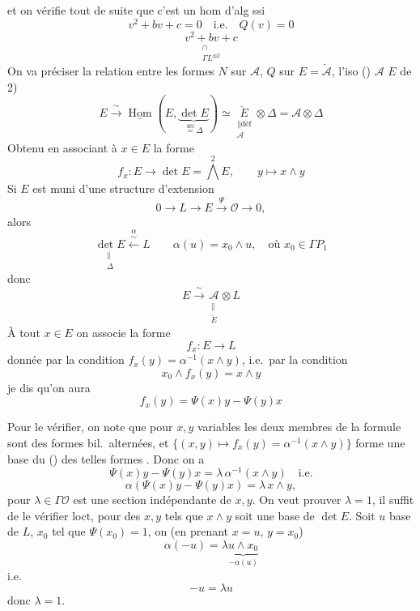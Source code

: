 \documentclass[11pt,a4paper]{article}
\begin{document}
et on vérifie tout de suite que c'est un hom d'alg ssi
\[
  v^2 + b v + c = 0 \quad \text{i.e.} \quad Q(v) = 0
\]
\[
  \underset{\substack{\cap \\ \Gamma L^{\otimes 2}}}{v^2 + b v + c}
\]
On va préciser la relation entre les formes $N$ sur $\mathcal{A}$, $Q$ sur $E = \check{\mathcal{A}}$,   l'iso () \ill{} $\mathcal{A}$ $E$    de 2)
\[
  E \xrightarrow{\ \sim\ } \underline{\operatorname{Hom}}(E, \underbrace{\det E}_{\overset{\text{déf}}{=} \Delta}) \simeq \underset{\substack{\| \text{déf} \\ \mathcal{A}}}{\check{E}} \otimes \Delta = \mathcal{A} \otimes \Delta
\]
Obtenu en associant à $x \in E$ la forme
\[
  f_x : E \to \det E = \textstyle\bigwedge^2 E , \qquad y \mapsto x \wedge y
\]
Si $E$ est muni d'une structure d'extension
\[
  0 \to L \to E \xrightarrow{\ \Psi\ } \mathcal{O} \to 0 ,
\]
alors
\[
  \underset{\substack{\| \\ \Delta}}{\det E} \overset{\alpha}{\xleftarrow{\ \sim\ }} L
  \qquad \alpha(u) = x_0 \wedge u , \quad \text{où } x_0 \in \Gamma P_1
\]
donc
\[
  E \xrightarrow{\ \sim\ } \underset{\substack{\| \\ \check{E}}}{\mathcal{A}} \otimes L
\]
À tout $x \in E$ on associe la forme
\[
  f_x : E \to L
\]
donnée par la condition $f_x(y) = \alpha^{-1}(x \wedge y)$, i.e.\ par la condition
\[
  x_0 \wedge f_x(y) = x \wedge y
\]
  je dis qu'on aura
\[
  f_x(y) = \Psi(x) y - \Psi(y) x
\]

Pour le vérifier, on note que pour $x, y$ variables les deux membres de la formule sont des formes bil.\ alternées, et $\{(x, y) \mapsto f_x(y) = \alpha^{-1}(x \wedge y)\}$ forme une base du \struck{\ill{}} \ill{} (\ill{}) des telles formes . Donc on a  \ill{}
\[
  \Psi(x) y - \Psi(y) x = \lambda\, \alpha^{-1}(x \wedge y) \quad \text{i.e.}
\]
\[
  \alpha(\Psi(x) y - \Psi(y) x) = \lambda\, x \wedge y ,
\]
pour $\lambda \in \Gamma \mathcal{O}$ est une section indépendante de $x, y$. On veut prouver $\lambda = 1$, il suffit de le vérifier loct, pour des $x, y$ tels que $x \wedge y$ soit une base de $\det E$. Soit $u$ base de $L$, $x_0$ tel que $\Psi(x_0) = 1$, on  (en prenant $x = u$, $y = x_0$)
\[
  \alpha(-u) = \lambda \underbrace{u \wedge x_0}_{-\alpha(u)}
\]
i.e.
\[
  -u = \lambda u
\]
donc  $\lambda = 1$.
\end{document}
